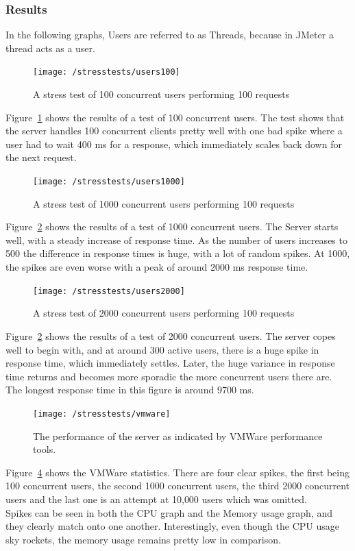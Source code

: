 \documentclass[preprint,12pt,3p]{elsarticle}
\begin{document}
\subsubsection{Results}
In the following graphs, Users are referred to as Threads, because in JMeter a thread acts as a user.
\begin{figure}[H]
    \centering
    \texttt{[image: /stresstests/users100]}
    \caption {A stress test of 100 concurrent users performing 100 requests}
    \label{fig:stress100}
\end{figure}
Figure~\ref{fig:stress100} shows the results of a test of 100 concurrent users. The test shows that the server handles 100 concurrent clients pretty well with one bad spike where a user had to wait 400 ms for a response, which immediately scales back down for the next request.
\begin{figure}[H]
    \centering
    \texttt{[image: /stresstests/users1000]}
    \caption {A stress test of 1000 concurrent users performing 100 requests}
    \label{fig:stress1000}
\end{figure}
Figure~\ref{fig:stress1000} shows the results of a test of 1000 concurrent users. The Server starts well, with a steady increase of response time. As the number of users increases to 500 the difference in response times is huge, with a lot of random spikes. At 1000, the spikes are even worse with a peak of around 2000 ms response time.
\begin{figure}[H]
    \centering
    \texttt{[image: /stresstests/users2000]}
    \caption {A stress test of 2000 concurrent users performing 100 requests}
    \label{fig:stress2000}
\end{figure}
Figure~\ref{fig:stress1000} shows the results of a test of 2000 concurrent users. The server copes well to begin with, and at around 300 active users, there is a huge spike in response time, which immediately settles. Later, the huge variance in response time returns and becomes more sporadic the more concurrent users there are. The longest response time in this figure is around 9700 ms.

\begin{figure}[H]
    \centering
    \texttt{[image: /stresstests/vmware]}
    \caption {The performance of the server as indicated by VMWare performance tools.}
    \label{fig:stressvmware}
\end{figure}
Figure~\ref{fig:stressvmware} shows the VMWare statistics. There are four clear spikes, the first being 100 concurrent users, the second 1000 concurrent users, the third 2000 concurrent users and the last one is an attempt at 10,000 users which was omitted.\\
Spikes can be seen in both the CPU graph and the Memory usage graph, and they clearly match onto one another. Interestingly, even though the CPU usage sky rockets, the memory usage remains pretty low in comparison.
\end{document}
